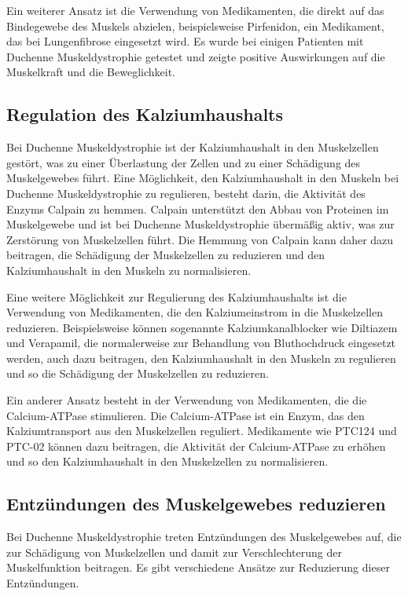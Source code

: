 \documentclass[fontsize=14pt,a4paper,headinclude,DIV=calc,automark]{scrbook}
\begin{document}
Ein weiterer Ansatz ist die Verwendung von Medikamenten, die direkt auf das Bindegewebe des Muskels abzielen, beispielsweise Pirfenidon, ein Medikament, das bei Lungenfibrose eingesetzt wird. Es wurde bei einigen Patienten mit Duchenne Muskeldystrophie getestet und zeigte positive Auswirkungen auf die Muskelkraft und die Beweglichkeit.

\subsection{Regulation des Kalziumhaushalts}

Bei Duchenne Muskeldystrophie ist der Kalziumhaushalt in den Muskelzellen gestört, was zu einer Überlastung der Zellen und zu einer Schädigung des Muskelgewebes führt. Eine Möglichkeit, den Kalziumhaushalt in den Muskeln bei Duchenne Muskeldystrophie zu regulieren, besteht darin, die Aktivität des Enzyms Calpain zu hemmen. Calpain unterstützt den Abbau von Proteinen im Muskelgewebe und ist bei Duchenne Muskeldystrophie übermäßig aktiv, was zur Zerstörung von Muskelzellen führt. Die Hemmung von Calpain kann daher dazu beitragen, die Schädigung der Muskelzellen zu reduzieren und den Kalziumhaushalt in den Muskeln zu normalisieren.

Eine weitere Möglichkeit zur Regulierung des Kalziumhaushalts ist die Verwendung von Medikamenten, die den Kalziumeinstrom in die Muskelzellen reduzieren. Beispielsweise können sogenannte Kalziumkanalblocker wie Diltiazem und Verapamil, die normalerweise zur Behandlung von Bluthochdruck eingesetzt werden, auch dazu beitragen, den Kalziumhaushalt in den Muskeln zu regulieren und so die Schädigung der Muskelzellen zu reduzieren.

Ein anderer Ansatz besteht in der Verwendung von Medikamenten, die die Calcium-ATPase stimulieren. Die Calcium-ATPase ist ein Enzym, das den Kalziumtransport aus den Muskelzellen reguliert. Medikamente wie PTC124 und PTC-02 können dazu beitragen, die Aktivität der Calcium-ATPase zu erhöhen und so den Kalziumhaushalt in den Muskelzellen zu normalisieren.

\subsection{Entzündungen des Muskelgewebes reduzieren}

Bei Duchenne Muskeldystrophie treten Entzündungen des Muskelgewebes auf, die zur Schädigung von Muskelzellen und damit zur Verschlechterung der Muskelfunktion beitragen. Es gibt verschiedene Ansätze zur Reduzierung dieser Entzündungen.
\end{document}
